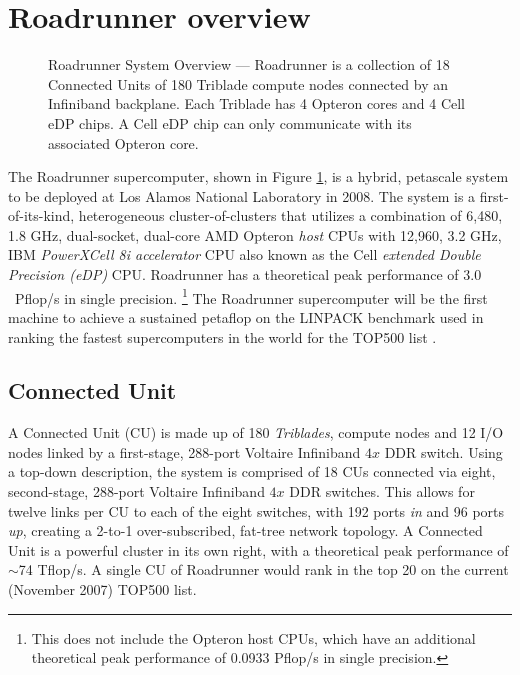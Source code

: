 \documentclass[letter,10pt]{article}
\begin{document}
\section{Roadrunner overview}

\begin{figure}
    \begin{center}
    \scalebox{0.3}{}
    \caption{Roadrunner System Overview ---
Roadrunner is a collection of 18 Connected Units of
180 Triblade compute nodes connected by an Infiniband backplane.
Each Triblade has 4 Opteron cores and 4 Cell eDP chips.
A Cell eDP chip can only communicate with its associated Opteron core.}
    \label{fig:system}
    \end{center}
\end{figure}

The Roadrunner supercomputer, shown in Figure \ref{fig:system}, is a
hybrid, petascale system to be deployed at Los Alamos National
Laboratory in 2008.  The system is a first-of-its-kind, heterogeneous
cluster-of-clusters that utilizes a combination of 6,480, 1.8 GHz,
dual-socket, dual-core AMD Opteron \emph{host} CPUs with 12,960, 3.2
GHz, IBM \emph{PowerXCell 8i accelerator} CPU also known as the Cell
\emph{extended Double Precision (eDP)} CPU.  Roadrunner has a
theoretical peak performance of $3.0$~Pflop/s in single precision.
\footnote{This does not include the Opteron host CPUs, which have
an additional theoretical peak performance of 0.0933 Pflop/s in
single precision.}  The Roadrunner supercomputer will be the first machine 
to achieve a sustained petaflop on the LINPACK benchmark used in ranking
the fastest supercomputers in the world for the TOP500 list
\cite{top500}.

\subsection{Connected Unit}

A Connected Unit (CU) is made up of 180 \emph{Triblades}, compute
nodes and 12 I/O nodes linked by a first-stage, 288-port Voltaire
Infiniband $4x$ DDR switch.  Using a top-down description, the
system is comprised of 18 CUs connected via eight, second-stage,
288-port Voltaire Infiniband $4x$ DDR switches.  This allows for
twelve links per CU to each of the eight switches, with 192 ports
\emph{in} and 96 ports \emph{up}, creating a 2-to-1 over-subscribed,
fat-tree network topology.  A Connected Unit is a powerful cluster in
its own right, with a theoretical peak performance of $\sim$74
Tflop/s.  A single CU of Roadrunner would rank in the top 20 on the
current (November 2007) TOP500 list.
\end{document}
